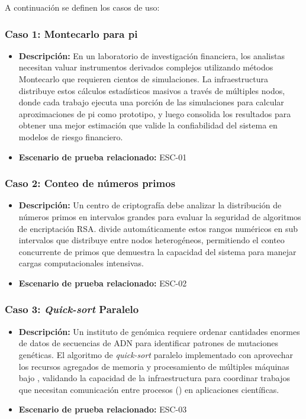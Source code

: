 A continuación se definen los casos de uso:

\subsubsection{Caso 1: Montecarlo para pi}
\noindent
\begin{itemize}
    \item \textbf{Descripción:} En un laboratorio de investigación financiera, los analistas necesitan valuar instrumentos derivados complejos utilizando métodos Montecarlo que requieren cientos de simulaciones. La infraestructura \HTCondor distribuye estos cálculos estadísticos masivos a través de múltiples nodos, donde cada trabajo ejecuta una porción de las simulaciones para calcular aproximaciones de pi como prototipo, y luego consolida los resultados para obtener una mejor estimación que valide la confiabilidad del sistema en modelos de riesgo financiero.
    \item \textbf{Escenario de prueba relacionado:} ESC-01
\end{itemize}

\subsubsection{Caso 2: Conteo de números primos}
\noindent
\begin{itemize}
    \item \textbf{Descripción:} Un centro de criptografía debe analizar la distribución de números primos en intervalos grandes para evaluar la seguridad de algoritmos de encriptación RSA. \HTCondor divide automáticamente estos rangos numéricos en sub intervalos que distribuye entre nodos heterogéneos, permitiendo el conteo concurrente de primos que demuestra la capacidad del sistema para manejar cargas computacionales intensivas.
    \item \textbf{Escenario de prueba relacionado:} ESC-02
\end{itemize}

\subsubsection{Caso 3: \textit{Quick-sort} Paralelo}
\noindent
\begin{itemize}
    \item \textbf{Descripción:} Un instituto de genómica requiere ordenar cantidades enormes de datos de secuencias de ADN para identificar patrones de mutaciones genéticas. El algoritmo de \textit{quick-sort} paralelo implementado con \MPI aprovechar los recursos agregados de memoria y procesamiento de múltiples máquinas bajo \HTCondor, validando la capacidad de la infraestructura para coordinar trabajos que necesitan comunicación entre procesos (\IPC) en aplicaciones científicas.
    \item \textbf{Escenario de prueba relacionado:} ESC-03
\end{itemize}

